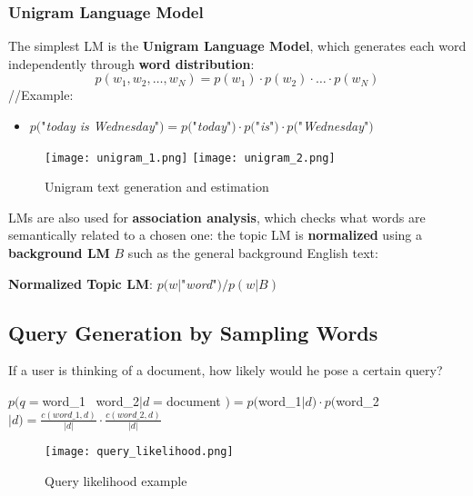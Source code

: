 \documentclass{article}
\begin{document}
\subsubsection{Unigram Language Model}
The simplest LM is the \textbf{Unigram Language Model}, which generates each word independently through \textbf{word distribution}:
\[
    p(w_1,w_2,\dots , w_N) = p(w_1) \cdot p(w_2) \cdot \dots \cdot p(w_N)
\]
//Example:
\begin{itemize}
    \item $p($"\textit{today is Wednesday}"$) = p($"\textit{today}"$) \cdot p($"\textit{is}"$) \cdot p($"\textit{Wednesday}"$)$
\end{itemize}
\begin{figure}[H]
    \centering
    \texttt{[image: unigram\_1.png]}
    \texttt{[image: unigram\_2.png]}
    \caption{Unigram text generation and estimation}
\end{figure}
LMs are also used for \textbf{association analysis}, which checks what words are semantically related to a chosen one: the topic LM is \textbf{normalized} using a \textbf{background LM} $B$ such as the general background English text:
\begin{center}
    \textbf{Normalized Topic LM}: $p(w|$"\textit{word}"$) / p(w|B)$
\end{center}

\subsection{Query Generation by Sampling Words}
If a user is thinking of a document, how likely would he pose a certain query?
\begin{center}
    $p(q = $word\_1 \ word\_2$ | d = $document $) = p($word\_1$|d) \cdot p($word\_2$|d) = \displaystyle\frac{c(word\_1, d)}{|d|} \cdot\displaystyle\frac{c(word\_2, d)}{|d|} $ 
\end{center}
\begin{figure}[H]
    \centering
    \texttt{[image: query\_likelihood.png]}
    \caption{Query likelihood example}
\end{figure}
\end{document}
